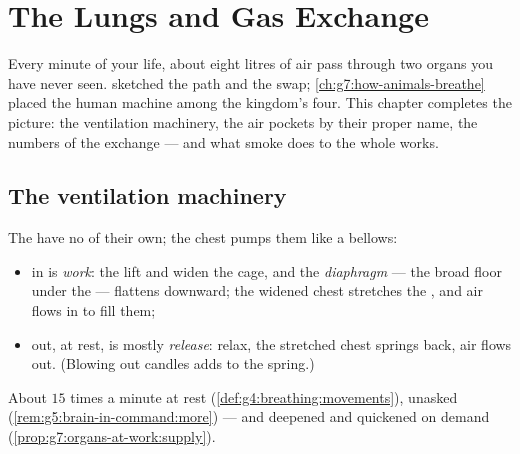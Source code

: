 \chapter{The Lungs and Gas Exchange}\label{ch:g7:lungs-and-gas-exchange}

Every minute of your life, about eight litres of air pass
through two organs you have never seen. 
sketched the path and the swap; \cref{ch:g7:how-animals-breathe}
placed the human machine among the kingdom's four. This
chapter completes the picture: the ventilation machinery,
the air pockets by their proper name, the numbers of the
exchange --- and what smoke does to the whole works.

\section{The ventilation machinery}

\begin{proposition}\label{prop:g7:lungs-and-gas-exchange:ventilation}
The  have no  of their own; the chest pumps
them like a bellows:
\begin{itemize}
  \item {} in is \emph{work}: the   lift
        and widen the cage, and the
        \emph{diaphragm} --- the broad
         floor under the  --- flattens
        downward; the widened chest stretches the ,
        and air flows in to fill them;
  \item {} out, at rest, is mostly \emph{release}:
         relax, the stretched chest springs back,
        air flows out. (Blowing out candles adds 
        to the spring.)
\end{itemize}
About $15$ times a minute at rest
(\cref{def:g4:breathing:movements}), unasked
(\cref{rem:g5:brain-in-command:more}) --- and deepened
and quickened on demand
(\cref{prop:g7:organs-at-work:supply}).
\end{proposition}
\admitted

